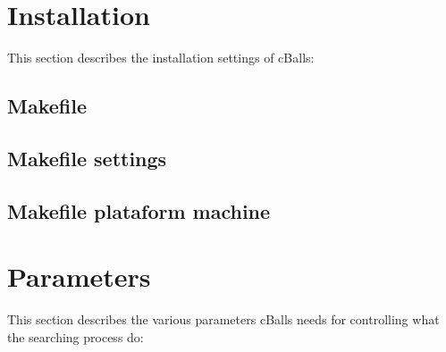 \documentclass[letterpaper,10pt,english]{sphinxmanual}
\begin{document}
\sphinxstepscope


\chapter{Installation}
\label{\detokenize{installation:installation}}\label{\detokenize{installation::doc}}
\sphinxAtStartPar
This section describes the installation settings of cBalls:


\section{Makefile}
\label{\detokenize{installation:makefile}}

\section{Makefile settings}
\label{\detokenize{installation:makefile-settings}}

\section{Makefile plataform machine}
\label{\detokenize{installation:makefile-plataform-machine}}
\sphinxstepscope


\chapter{Parameters}
\label{\detokenize{params:parameters}}\label{\detokenize{params::doc}}
\sphinxAtStartPar
This section describes the various parameters cBalls needs for controlling
what the searching process do:
\end{document}
